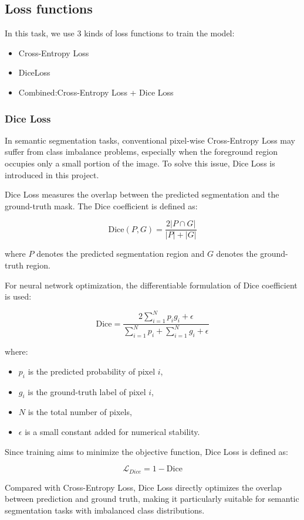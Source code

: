 \subsection{Loss functions}
In this task, we use 3 kinds of loss functions to train the model:
\begin{itemize}
    \item Cross-Entropy Loss
    \item DiceLoss
    \item Combined:Cross-Entropy Loss + Dice Loss
\end{itemize}

\subsubsection{Dice Loss}
In semantic segmentation tasks, conventional pixel-wise Cross-Entropy Loss may suffer from class imbalance problems, especially when the foreground region occupies only a small portion of the image. To solve this issue, Dice Loss is introduced in this project.

Dice Loss measures the overlap between the predicted segmentation and the ground-truth mask. The Dice coefficient is defined as:

\[
\mathrm{Dice}(P, G)
=
\frac{2|P \cap G|}
{|P| + |G|}
\]

where \(P\) denotes the predicted segmentation region and \(G\) denotes the ground-truth region.

For neural network optimization, the differentiable formulation of Dice coefficient is used:

\[
\mathrm{Dice}
=
\frac{
2 \sum_{i=1}^{N} p_i g_i + \epsilon
}{
\sum_{i=1}^{N} p_i
+
\sum_{i=1}^{N} g_i
+
\epsilon
}
\]

where:
\begin{itemize}
    \item \(p_i\) is the predicted probability of pixel \(i\),
    \item \(g_i\) is the ground-truth label of pixel \(i\),
    \item \(N\) is the total number of pixels,
    \item \(\epsilon\) is a small constant added for numerical stability.
\end{itemize}

Since training aims to minimize the objective function, Dice Loss is defined as:

\[
\mathcal{L}_{Dice}
=
1 - \mathrm{Dice}
\]

Compared with Cross-Entropy Loss, Dice Loss directly optimizes the overlap between prediction and ground truth, making it particularly suitable for semantic segmentation tasks with imbalanced class distributions.

